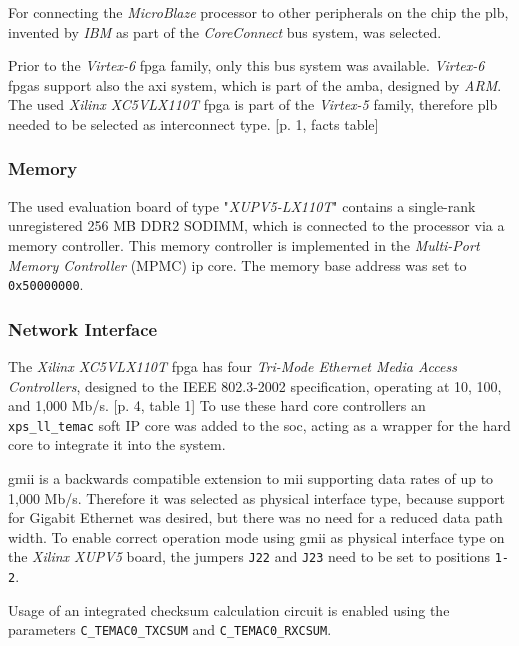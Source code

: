 For connecting the \textit{MicroBlaze} processor to other peripherals on the chip the \gls{plb}, invented by \textit{IBM} as part of the \textit{CoreConnect} bus system, was selected.

Prior to the \textit{Virtex-6} \gls{fpga} family, only this bus system was available. \textit{Virtex-6} \gls{fpga}s support also the \gls{axi} system, which is part of the \gls{amba}, designed by \textit{ARM}. The used \textit{Xilinx XC5VLX110T} \gls{fpga} is part of the \textit{Virtex-5} family, therefore \gls{plb} needed to be selected as interconnect type. \cite{axi_interconnect}[p. 1, facts table]

\subsubsection{Memory}

The used evaluation board of type "\textit{XUPV5-LX110T}" contains a single-rank unregistered 256 MB DDR2 SODIMM, which is connected to the processor via a memory controller. This memory controller is implemented in the \textit{Multi-Port Memory Controller} (MPMC) \gls{ip} core. The memory base address was set to \texttt{0x50000000}.

\subsubsection{Network Interface}
\label{preceeding:net}

The \textit{Xilinx XC5VLX110T} \gls{fpga} has four \textit{Tri-Mode Ethernet Media Access Controllers}, designed to the IEEE 802.3-2002 specification, operating at 10, 100, and 1,000 Mb/s. \cite{virtex5}[p. 4, table 1] To use these hard core controllers an \texttt{xps\_ll\_temac} soft IP core was added to the \gls{soc}, acting as a wrapper for the hard core to integrate it into the system.


\gls{gmii} is a backwards compatible extension to \gls{mii} supporting data rates of up to 1,000 Mb/s. Therefore it was selected as physical interface type, because support for Gigabit Ethernet was desired, but there was no need for a reduced data path width. To enable correct operation mode using \gls{gmii} as physical interface type on the \textit{Xilinx XUPV5} board, the jumpers \texttt{J22} and \texttt{J23} need to be set to positions \texttt{1-2}.

Usage of an integrated checksum calculation circuit is enabled using the parameters \texttt{C\_TEMAC0\_TXCSUM} and \texttt{C\_TEMAC0\_RXCSUM}.

